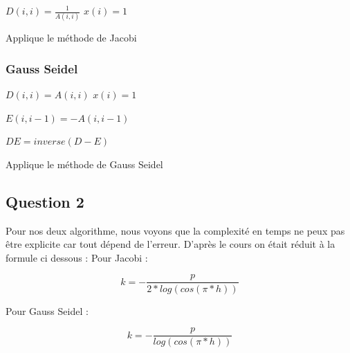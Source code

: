 \documentclass[11pt]{article}
\DeclarePairedDelimiter{\norm}{\lVert}{\rVert}
\begin{document}
\begin{algorithm} [H]
  \SetAlgoLined
  
   {
    $D(i,i) = \frac{1}{A(i, i)}$\;
    $x(i) = 1$\;
  }
  

  \caption{Applique le méthode de Jacobi}
\end{algorithm}

\subsubsection{Gauss Seidel}

\begin{algorithm} [H]
  \SetAlgoLined
  
   {
    $D(i,i) = A(i, i)$\;
    $x(i) = 1$\;
  }

   {
    $E(i,i - 1) = - A(i, i - 1)$\;
  }

  $DE = inverse(D - E)$\; 


  \caption{Applique le méthode de Gauss Seidel}
\end{algorithm}

\subsection{Question 2}

Pour nos deux algorithme, nous voyons que la complexité en temps ne
peux pas être explicite car tout dépend de l'erreur. D'après le cours
on était réduit à la formule ci dessous :\newline
\vspace{5mm}
Pour Jacobi :

\begin{equation*}
  k = - \frac{p}{2 * log(cos(\pi * h))}
\end{equation*}

Pour Gauss Seidel :

\begin{equation*}
  k = - \frac{p}{log(cos(\pi * h))}
\end{equation*}
\end{document}
